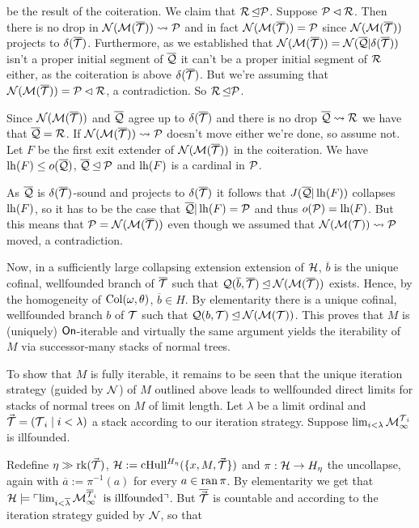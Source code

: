 \documentclass[../../main]{subfiles}
\begin{document}
{{    be the result of the coiteration. We claim that $\R\init\P$. Suppose $\P\pinit\R$. Then there is no drop in $\N(\M(\overline\T))\leadsto\P$ and in fact $\N(\M(\overline\T))=\P$ since $\N(\M(\overline\T))$ projects to $\delta(\overline\T)$. Furthermore, as we established that $\N(\M(\overline\T))=\N(\overline\Q|\delta(\overline\T))$ isn't a proper initial segment of $\overline\Q$ it can't be a proper initial segment of $\R$ either, as the coiteration is above $\delta(\overline\T)$. But we're assuming that $\N(\M(\overline\T))=\P\pinit\R$, a contradiction. So $\R\init\P$.
        
    \qquad Since $\N(\M(\overline\T))$ and $\overline\Q$ agree up to $\delta(\overline\T)$ and there is no drop $\overline\Q\leadsto\R$ we have that $\overline\Q=\R$. If $\N(\M(\overline\T))\leadsto\P$ doesn't move either we're done, so assume not. Let $F$ be the first exit extender of $\N(\M(\overline\T))$ in the coiteration. We have $\lh(F) \le o(\overline\Q)$, $\overline\Q\init\P$ and $\lh(F)$ is a cardinal in $\P$.
        
    \qquad As $\overline\Q$ is $\delta(\overline\T)$-sound and projects to $\delta(\overline\T)$ it follows that $J(\overline\Q|\lh(F))$ collapses $\lh(F)$, so it has to be the case that $\overline\Q|\lh(F)=\P$ and thus $o(\P)=\lh(F)$. But this means that $\P=\N(\M(\overline\T))$ even though we assumed that $\N(\M(\T))\leadsto\P$ moved, a contradiction.
  }

  Now, in a sufficiently large collapsing extension extension of $\h$, $\overline b$ is the unique cofinal, wellfounded branch of $\overline\T$ such that $\Q(\overline b,\overline\T) \init\N(\M(\overline\T))$ exists. Hence, by the homogeneity of $\col(\omega,\theta)$, $\overline b \in H$. By elementarity there is a unique cofinal, wellfounded branch $b$ of $\T$ such that $\Q(b,\T)\init\N(\M(\T))$. This proves that $M$ is (uniquely) $\on$-iterable and virtually the same argument yields the iterability of $M$ via successor-many stacks of normal trees.
  
  \qquad To show that $M$ is fully iterable, it remains to be seen that the unique iteration strategy (guided by $\N$) of $M$ outlined above leads to wellfounded direct limits for stacks of normal trees on $M$ of limit length. Let $\lambda$ be a limit ordinal and $\vec\T = (\T_i \mid i<\lambda)$ a stack according to our iteration strategy. Suppose $\lim_{i<\lambda}\M^{\T_i}_\infty$ is illfounded.
  
  \qquad Redefine $\eta\gg\rk(\vec\T)$, $\h:=\chull^{H_\eta}(\{x,M,\vec\T\})$ and $\pi:\h\to H_\eta$ the uncollapse, again with $\overline a:=\pi^{-1}(a)$ for every $a\in\ran\pi$. By elementarity we get that $\h\models\godel{\lim_{i<\overline\lambda}\M^{\overline\T_i}_\infty\text{ is illfounded}}$. But $\overline{\vec\T}$ is countable and according to the iteration strategy guided by $\N$, so that

}
\end{document}
